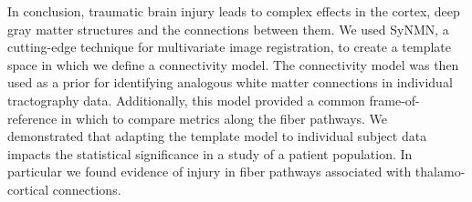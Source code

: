 In conclusion, traumatic brain injury leads to complex effects in the cortex, deep gray matter structures and the connections between them. We used SyNMN, a cutting-edge technique for multivariate image registration, to create a template space in which we define a connectivity model. The connectivity model was then used as a prior for identifying analogous white matter connections in individual tractography data. Additionally, this model provided a common frame-of-reference in which to compare metrics along the fiber pathways. We demonstrated that adapting the template model to individual subject data impacts the statistical significance in a study of a patient population. In particular we found evidence of injury in fiber pathways associated with thalamo-cortical connections. 

